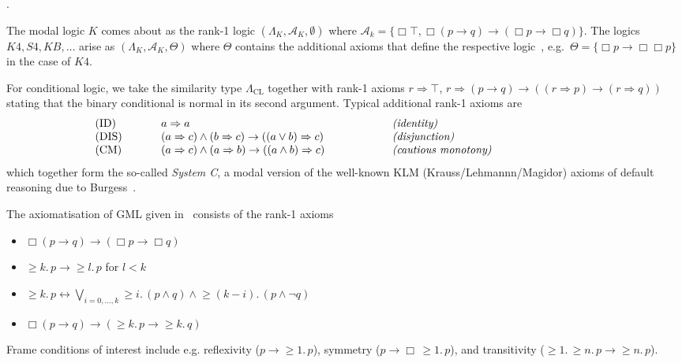 \documentclass[proceedings]{stacs}
\makeatletter
\theoremstyle{definition}
\theoremstyle{plain}
\renewcommand{\conj}{\wedge}
\newcommand{\disj}{\vee}
\newcommand{\modimpl}{\to}
\DeclareMathOperator{\mge}{\ge}
\newcommand{\Ax}{\mathcal{A}}
\newenvironment{axarraycomment}{\begin{array}{@{\hspace{2em}}p{5em}p{20em}p{20em}}}{\end{array}}
\newcommand{\Lor}{\bigvee}
\newcommand{\To}{\Rightarrow}
\newcommand{\biimpl}{\leftrightarrow}
\newcommand{\CL}{\mathrm{CL}}
\newcounter{blubber}
\newenvironment{sparenumerate}
{\begin{list}
  {\arabic{blubber}.}
  {\usecounter{blubber}
   \setlength{\leftmargin}{0pt}
    \setlength{\parsep}{0pt}
    \setlength{\itemindent}{3ex}
    \setlength{\itemsep}{2pt}   
    \setlength{\listparindent}{3ex}
  }
}
{\end{list}}
\makeatother
\begin{document}
\begin{exas}\label{expl:axioms}
\begin{sparenumerate}
\item \label{item:ax-kripke} The modal logic $K$ comes about as the
  rank-1 logic $(\Lambda_K, \Ax_K, \emptyset)$ where $\Ax_k = \lbrace
  \Box\top,\Box(p \to q) \to (\Box p \to \Box q) \rbrace$. The logics
  $K4, S4, KB, \dots$ arise as $(\Lambda_K, \Ax_K, \Theta)$ where
  $\Theta$ contains the additional axioms that define the respective
  logic~\cite{BlackburnEA01}, e.g.\ $\Theta=\{\Box p\to\Box\Box p\}$
  in the case of $K4$.
\item\label{item:ax-cond} For conditional logic, we take the
  similarity type $\Lambda_\CL$ together with rank-1 axioms $r\To
  \top$, $r \To (p \to q) \to ((r \To p) \to (r \To q))$ stating that
  the binary conditional is normal in its second argument. Typical
  additional rank-1 axioms are
  \begin{equation*}
    \begin{axarraycomment}
      \textrm{(ID)} & $a\To a$ &\emph{(identity)}\\
      \textrm{(DIS)} & $(a\To c) \conj (b\To c)\to ((a\disj b)\To c)$&
      \emph{(disjunction)}\\
      \textrm{(CM)} & $(a\To c) \conj (a\To b)\to ((a\conj b)\To c)$&
      \emph{(cautious monotony)}\\
    \end{axarraycomment}
  \end{equation*}
  which together form the so-called \emph{System C}, a modal version of the
  well-known KLM (Krauss/Lehmannn/Magidor) axioms of default reasoning
  due to Burgess~\cite{Burgess81}.
\item\label{item:ax-gml} The axiomatisation of GML
  given in~\cite{Fine72} consists of the rank-1 axioms
\begin{itemize}
\item[] $\Box (p \to q) \to (\Box p \to \Box q)$
\item[] $\mge k.\, p \to \mge l.\,p$ for $l < k$
\item[] $\mge k.\, p \biimpl \Lor_{i=0, \dots, k} \mge i.\, (p \land q)
\land \mge(k-i).\, (p \land \neg q)$
\item[] $\Box (p \to q) \to (\mge k.\,p \to \mge k.\,q)$
\end{itemize}
Frame conditions of interest include e.g. reflexivity ($p\modimpl\mge
1.\,p$), symmetry ($p\modimpl\Box \,\mge 1.  \,p$), and transitivity
($\mge 1.\,\mge n.\,p\modimpl\mge n.\,p$).
\end{sparenumerate}
\end{exas}
\end{document}
